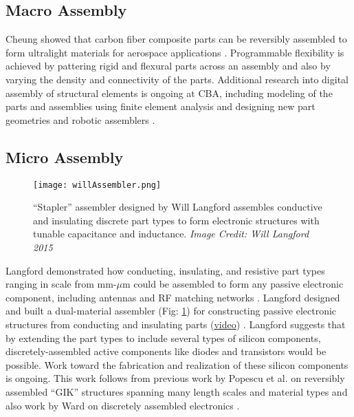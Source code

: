 {\subsection{Macro Assembly}

Cheung showed that carbon fiber composite parts can be reversibly assembled to form ultralight materials for aerospace applications \cite{Cheung2013}.  Programmable flexibility is achieved by pattering rigid and flexural parts across an assembly and also by varying the density and connectivity of the parts.  Additional research into digital assembly of structural elements is ongoing at CBA, including modeling of the parts and assemblies using finite element analysis \cite{Calisch2014} and designing new part geometries and robotic assemblers \cite{Carney2015}.

\subsection{Micro Assembly}

\begin{figure}
  \texttt{[image: willAssembler.png]}
  \caption{``Stapler'' assembler designed by Will Langford assembles conductive and insulating discrete part types to form electronic structures with tunable capacitance and inductance.  \textit{Image Credit: Will Langford 2015}}
  \label{fig:willAssembler}
\end{figure}



Langford demonstrated how conducting, insulating, and resistive part types ranging in scale from mm-$\mu$m could be assembled to form any passive electronic component, including antennas and RF matching networks \cite{Langford2014}.  Langford designed and built a dual-material assembler (Fig: \ref{fig:willAssembler}) for constructing passive electronic structures from conducting and insulating parts (\href{http://dma.cba.mit.edu/stapler/video/dualstapler_full_1.mp4}{video}) \cite{LangfordWillGhassaeiAmandaGershenfeld2016}.  Langford suggests that by extending the part types to include several types of silicon components, discretely-assembled active components like diodes and transistors would be possible.  Work toward the fabrication and realization of these silicon components is ongoing.  This work follows from previous work by Popescu et al. on reversibly assembled ``GIK'' structures spanning many length scales and material types \cite{Popescu} and also work by Ward on discretely assembled electronics \cite{Ward2010}.
\\

}
